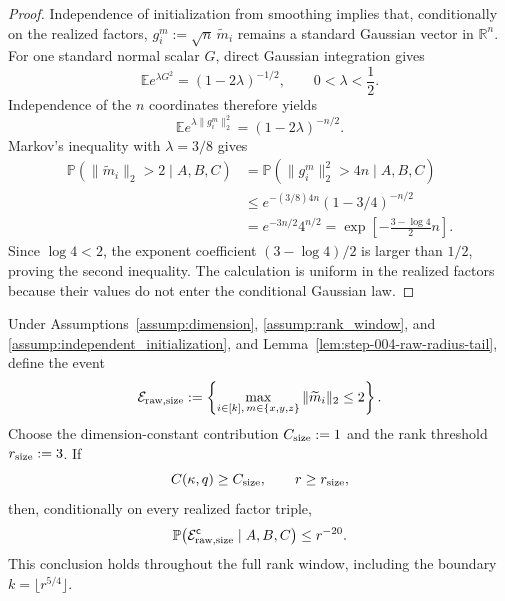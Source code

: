 \begin{proof}
Independence of initialization from smoothing
implies that, conditionally on the realized factors,
\(g_i^m:=\sqrt n\,\widetilde m_i\) remains a standard Gaussian vector in
\(\mathbb R^n\). For one standard normal scalar \(G\), direct Gaussian
integration gives
\[
  \mathbb E e^{\lambda G^2}=(1-2\lambda)^{-1/2},
  \qquad 0<\lambda<\frac12.
\]
Independence of the \(n\) coordinates therefore yields
\[
  \mathbb E e^{\lambda\|g_i^m\|_2^2}
  =(1-2\lambda)^{-n/2}.
\]
Markov's inequality with \(\lambda=3/8\) gives
\[
  \begin{aligned}
  \mathbb P\!\left(\|\widetilde m_i\|_2>2\mid A,B,C\right)
  &=\mathbb P\!\left(\|g_i^m\|_2^2>4n\mid A,B,C\right)\\
  &\le e^{-(3/8)4n}(1-3/4)^{-n/2}\\
  &=e^{-3n/2}4^{n/2}
   =\exp\!\left[-\frac{3-\log4}{2}n\right].
  \end{aligned}
\]
Since \(\log4<2\), the exponent coefficient
\((3-\log4)/2\) is larger than \(1/2\), proving the second inequality. The
calculation is uniform in the realized factors because their values do not
enter the conditional Gaussian law. 

\end{proof}


\begin{proposition}
\label{prop:step-004-uniform-raw-size}
Under Assumptions~\ref{assump:dimension}, \ref{assump:rank_window}, and
\ref{assump:independent_initialization}, and
Lemma~\ref{lem:step-004-raw-radius-tail}, define the event
\[
  \mathcal E_{\rm raw,size}
  :=\left\{\max_{i\in[k],\,m\in\{x,y,z\}}
       \|\widetilde m_i\|_2\le2\right\}.
\]
Choose the dimension-constant contribution
\(C_{\rm size}:=1\) and the rank threshold \(r_{\rm size}:=3\). If
\[
  C(\kappa,q)\ge C_{\rm size},\qquad r\ge r_{\rm size},
\]
then, conditionally on every realized factor triple,
\[
  \mathbb P\!\left(\mathcal E_{\rm raw,size}^{\mathsf c}
    \mid A,B,C\right)\le r^{-20}.
\]
This conclusion holds throughout the full rank window, including the boundary
\(k=\lfloor r^{5/4}\rfloor\).

\end{proposition}

